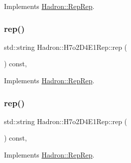 Implements \mbox{\hyperlink{structHadron_1_1RepRep_ab3213025f6de249f7095892109575fde}{Hadron\+::\+Rep\+Rep}}.

\mbox{\label{structHadron_1_1H7o2D4E1Rep_ae6cc5dc38275bfce35b58694bc85cfe1}} 
\subsubsection{\texorpdfstring{rep()}{rep()}\hspace{0.1cm}{\footnotesize\ttfamily [2/5]}}
{\footnotesize\ttfamily std\+::string Hadron\+::\+H7o2\+D4\+E1\+Rep\+::rep (\begin{DoxyParamCaption}{ }\end{DoxyParamCaption}) const\hspace{0.3cm}{\ttfamily [inline]}, {\ttfamily [virtual]}}



Implements \mbox{\hyperlink{structHadron_1_1RepRep_ab3213025f6de249f7095892109575fde}{Hadron\+::\+Rep\+Rep}}.

\mbox{\label{structHadron_1_1H7o2D4E1Rep_ae6cc5dc38275bfce35b58694bc85cfe1}} 
\subsubsection{\texorpdfstring{rep()}{rep()}\hspace{0.1cm}{\footnotesize\ttfamily [3/5]}}
{\footnotesize\ttfamily std\+::string Hadron\+::\+H7o2\+D4\+E1\+Rep\+::rep (\begin{DoxyParamCaption}{ }\end{DoxyParamCaption}) const\hspace{0.3cm}{\ttfamily [inline]}, {\ttfamily [virtual]}}



Implements \mbox{\hyperlink{structHadron_1_1RepRep_ab3213025f6de249f7095892109575fde}{Hadron\+::\+Rep\+Rep}}.

\mbox{\label{structHadron_1_1H7o2D4E1Rep_ae6cc5dc38275bfce35b58694bc85cfe1}} 
